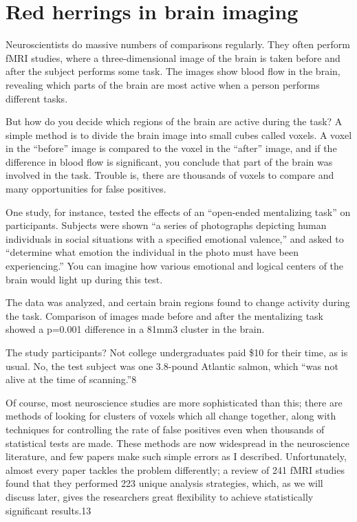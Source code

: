 \section{Red herrings in brain imaging}
\label{chp5:redherrings}

Neuroscientists do massive numbers of comparisons regularly. They often perform fMRI studies, where a three-dimensional image of the brain is taken before and after the subject performs some task. The images show blood flow in the brain, revealing which parts of the brain are most active when a person performs different tasks.

But how do you decide which regions of the brain are active during the task? A simple method is to divide the brain image into small cubes called voxels. A voxel in the “before” image is compared to the voxel in the “after” image, and if the difference in blood flow is significant, you conclude that part of the brain was involved in the task. Trouble is, there are thousands of voxels to compare and many opportunities for false positives.

One study, for instance, tested the effects of an “open-ended mentalizing task” on participants. Subjects were shown “a series of photographs depicting human individuals in social situations with a specified emotional valence,” and asked to “determine what emotion the individual in the photo must have been experiencing.” You can imagine how various emotional and logical centers of the brain would light up during this test.

The data was analyzed, and certain brain regions found to change activity during the task. Comparison of images made before and after the mentalizing task showed a p=0.001 difference in a 81mm3 cluster in the brain.

The study participants? Not college undergraduates paid \$10 for their time, as is usual. No, the test subject was one 3.8-pound Atlantic salmon, which “was not alive at the time of scanning.”8

Of course, most neuroscience studies are more sophisticated than this; there are methods of looking for clusters of voxels which all change together, along with techniques for controlling the rate of false positives even when thousands of statistical tests are made. These methods are now widespread in the neuroscience literature, and few papers make such simple errors as I described. Unfortunately, almost every paper tackles the problem differently; a review of 241 fMRI studies found that they performed 223 unique analysis strategies, which, as we will discuss later, gives the researchers great flexibility to achieve statistically significant results.13

